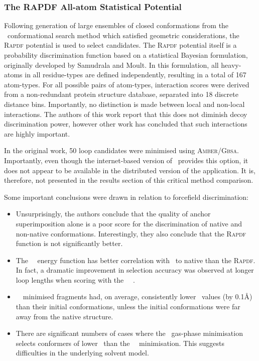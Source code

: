\subsubsection{The RAPDF All-atom Statistical Potential}

Following generation of large ensembles of closed conformations from the \rapper\ conformational search method which satisfied geometric considerations,
the \textsc{Rapdf} potential is used to select candidates. The \textsc{Rapdf} potential itself is a probability discrimination function
based on a statistical Bayesian formulation, originally developed by Samudrala and Moult\cite{FORCEFIELD:Samudrala1998}. In this formulation, all heavy-atoms in all residue-types are defined independently, resulting in a total of 167 atom-types. For all possible pairs of atom-types, interaction scores were derived from a non-redundant protein structure database, separated into 18 discrete distance bins. Importantly, no distinction is made between local and non-local interactions. The authors of this work report that this does not diminish decoy discrimination power, however other work has concluded that such interactions are highly important\cite{COMPCHEM:Zha2004}.

In the original
work, 50 loop candidates were minimised using \textsc{Amber/Gbsa}.
Importantly, even though the internet-based version of \rapper\ provides this option, it does not appear to be available in the distributed version of the application. It  is, therefore, not presented in the results section of this critical method comparison.

Some  important conclusions were drawn in relation to forcefield discrimination:\begin{itemize}\isep

\item 
Unsurprisingly, the authors conclude that the quality of anchor superimposition alone is a poor score for the discrimination of native and non-native conformations.
Interestingly, they also conclude that the \textsc{Rapdf} function is not
significantly better.

\item
The \amber\ \gbsa\ energy function has better correlation with \crms\ to native than the \textsc{Rapdf}. In fact, a dramatic
improvement in selection accuracy was observed at
longer loop lengths when scoring with the \amber\ \gbsa\ \forcefield.
\item
\amber\ \gbsa\ minimised fragments
had, on average, consistently lower \crms\ values
(by 0.1\AA) than their initial conformations, unless the initial
conformations were far away from the native structure.

\item
There are significant numbers of cases where the \amber\ gas-phase
minimisation selects conformers of lower \crms\ than the \amber\ \gbsa\ minimisation.
This suggests difficulties in the underlying solvent model.
\end{itemize}

